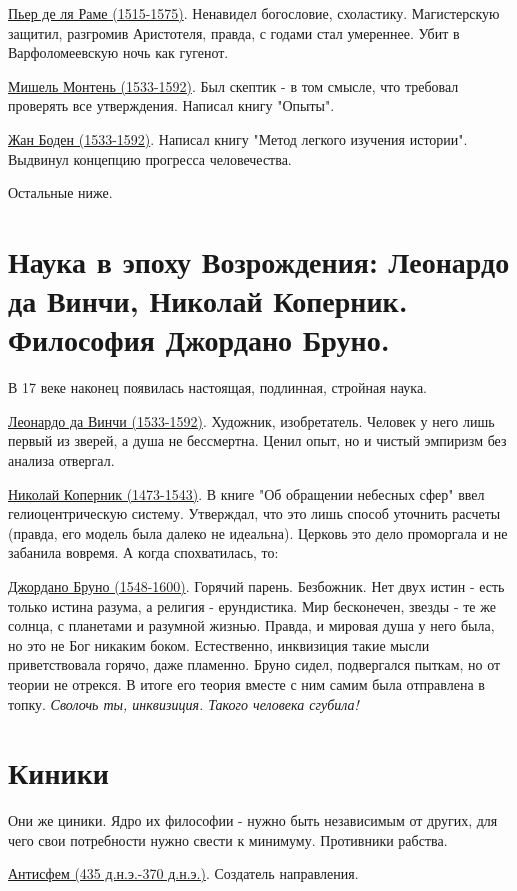 \documentclass[12pt,a4paper]{article}
\begin{document}
\underline{Пьер де ля Раме (1515-1575)}. Ненавидел богословие, схоластику. Магистерскую защитил, разгромив Аристотеля, правда, с годами стал умереннее. Убит в Варфоломеевскую ночь как гугенот.

\underline{Мишель Монтень (1533-1592)}. Был скептик - в том смысле, что требовал проверять все утверждения. Написал книгу "Опыты".

\underline{Жан Боден (1533-1592)}. Написал книгу "Метод легкого изучения истории". Выдвинул концепцию прогресса человечества.

Остальные ниже.

\section{Наука в эпоху Возрождения: Леонардо да Винчи, Николай Коперник. Философия Джордано Бруно.}

В 17 веке наконец появилась настоящая, подлинная, стройная наука. 

\underline{Леонардо да Винчи (1533-1592)}. Художник, изобретатель. Человек у него лишь первый из зверей, а душа не бессмертна. Ценил опыт, но и чистый эмпиризм без анализа отвергал.

\underline{Николай Коперник (1473-1543)}. В книге "Об обращении небесных сфер" ввел гелиоцентрическую систему. Утверждал, что это лишь способ уточнить расчеты (правда, его модель была далеко не идеальна). Церковь это дело проморгала и не забанила вовремя. А когда спохватилась, то:

\underline{Джордано Бруно (1548-1600)}. Горячий парень. Безбожник. Нет двух истин - есть только истина разума, а религия - ерундистика. Мир бесконечен, звезды - те же солнца, с планетами и разумной жизнью. Правда, и мировая душа у него была, но это не Бог никаким боком. Естественно, инквизиция такие мысли приветствовала горячо, даже пламенно. Бруно сидел, подвергался пыткам, но от теории не отрекся. В итоге его теория вместе с ним самим была отправлена в топку. \textit{Сволочь ты, инквизиция. Такого человека сгубила!}

\section{Киники}

Они же циники. Ядро их философии - нужно быть независимым от других, для чего свои потребности нужно свести к минимуму.
Противники рабства.

\underline{Антисфем (435 д.н.э.-370 д.н.э.)}. Создатель направления.
\end{document}
